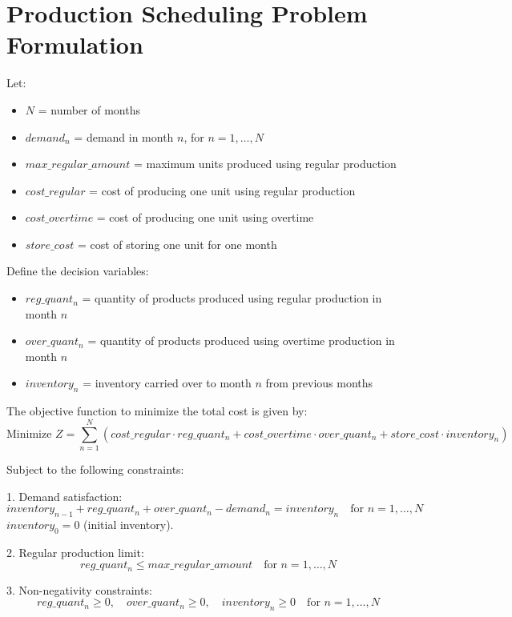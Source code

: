 \documentclass{article}
\begin{document}
\section*{Production Scheduling Problem Formulation}

Let:
\begin{itemize}
    \item $N$ = number of months
    \item $demand_n$ = demand in month $n$, for $n = 1, \ldots, N$
    \item $max\_regular\_amount$ = maximum units produced using regular production
    \item $cost\_regular$ = cost of producing one unit using regular production
    \item $cost\_overtime$ = cost of producing one unit using overtime
    \item $store\_cost$ = cost of storing one unit for one month
\end{itemize}

Define the decision variables:
\begin{itemize}
    \item $reg\_quant_n$ = quantity of products produced using regular production in month $n$
    \item $over\_quant_n$ = quantity of products produced using overtime production in month $n$
    \item $inventory_n$ = inventory carried over to month $n$ from previous months
\end{itemize}

The objective function to minimize the total cost is given by:
\[
\text{Minimize } Z = \sum_{n=1}^{N} \left( cost\_regular \cdot reg\_quant_n + cost\_overtime \cdot over\_quant_n + store\_cost \cdot inventory_n \right)
\]

Subject to the following constraints:

1. Demand satisfaction:
\[
inventory_{n-1} + reg\_quant_n + over\_quant_n - demand_n = inventory_n \quad \text{for } n = 1, \ldots, N
\]
    $inventory_0 = 0$ (initial inventory).

2. Regular production limit:
\[
reg\_quant_n \leq max\_regular\_amount \quad \text{for } n = 1, \ldots, N
\]

3. Non-negativity constraints:
\[
reg\_quant_n \geq 0, \quad over\_quant_n \geq 0, \quad inventory_n \geq 0 \quad \text{for } n = 1, \ldots, N
\]
\end{document}
